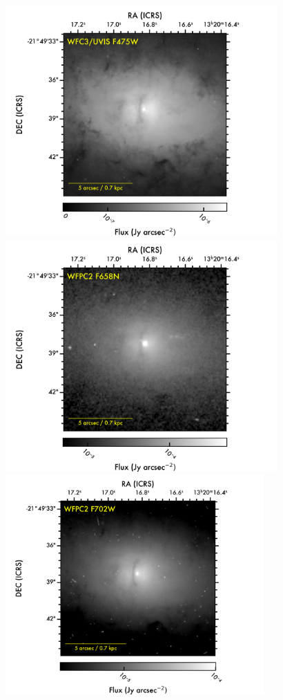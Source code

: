 \documentclass[modern]{CORE-AAS/aastex631}
\begin{document}
\begin{figure}[]
\begin{center}
\includegraphics[trim={0 25 60 0}, clip, height=8.85cm]{FIGURES/NGC5084_F475W.png}
\includegraphics[trim={140 25 60 0}, clip, height=8.85cm]{FIGURES/NGC5084_F658N.png}
\includegraphics[trim={0 0 60 57}, clip, height=8.4cm]{FIGURES/NGC5084_F702W.png}

\end{center}
\end{figure}
\end{document}
